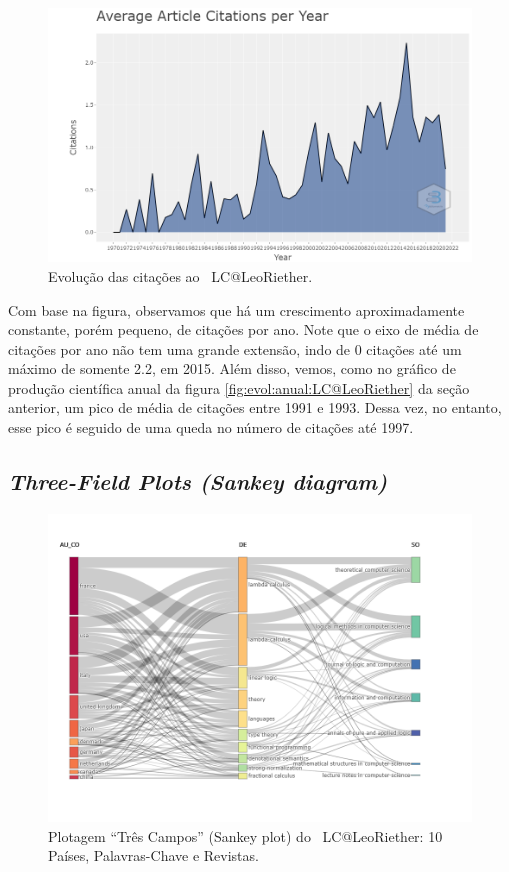 \begin{figure}
    \centering
    \includegraphics[width=1\textwidth]{experiments/LeoRiether/AnaliseBibliometrica/LambdaCalculus/WoS-20220208/Images/AverageCitationsPerYear.png}
    \caption{Evolução das citações ao \dataset\   LC@LeoRiether.}
    \label{fig:evol:anual:citacoes:LC@LeoRiether}
\end{figure}

Com base na figura, observamos que há um crescimento aproximadamente constante, porém pequeno, de citações por ano. Note que o eixo de média de citações por ano não tem uma grande extensão, indo de 0 citações até um máximo de somente 2.2, em 2015. Além disso, vemos, como no gráfico de produção científica anual da figura \ref{fig:evol:anual:LC@LeoRiether} da seção anterior, um pico de média de citações entre 1991 e 1993. Dessa vez, no entanto, esse pico é seguido de uma queda no número de citações até 1997.

\subsection{\textit{Three-Field Plots (Sankey diagram)}}

\begin{figure}
    \centering
    \includegraphics[angle=0,width=1\textwidth]{experiments/LeoRiether/AnaliseBibliometrica/LambdaCalculus/WoS-20220208/Images/ThreeFieldsPlot.png}
    \caption{Plotagem ``Três Campos'' (Sankey plot) do \dataset\   LC@LeoRiether: 10 Países, Palavras-Chave e Revistas.}
    \label{fig:LC@LeoRiether:ThreeFieldPlot}
\end{figure}

